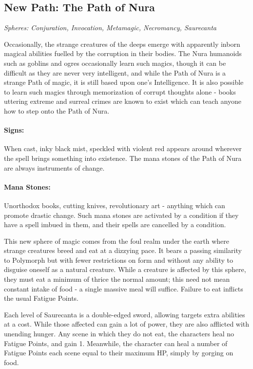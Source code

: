 \subsection{New Path: The Path of Nura}

\textit{Spheres: Conjuration, Invocation, Metamagic, Necromancy, Saurecanta}

\noindent Occasionally, the strange creatures of the deeps emerge with apparently inborn magical abilities fuelled by the corruption in their bodies.  The Nura humanoids such as goblins and ogres occasionally learn such magics, though it can be difficult as they are never very intelligent, and while the Path of Nura is a strange Path of magic, it is still based upon one's Intelligence.  It is also possible to learn such magics through memorization of corrupt thoughts alone - books uttering extreme and surreal crimes are known to exist which can teach anyone how to step onto the Path of Nura.

\paragraph{Signs:} When cast, inky black mist, speckled with violent red appears around wherever the spell brings something into existence.  The mana stones of the Path of Nura are always instruments of change.

\paragraph{Mana Stones:} Unorthodox books, cutting knives, revolutionary art - anything which can promote drastic change.  Such mana stones are activated by a condition if they have a spell imbued in them, and their spells are cancelled by a condition.


This new sphere of magic comes from the foul realm under the earth where strange creatures breed and eat at a dizzying pace.  It bears a passing similarity to Polymorph but with fewer restrictions on form and without any ability to disguise oneself as a natural creature.  While a creature is affected by this sphere, they must eat a minimum of thrice the normal amount; this need not mean constant intake of food - a single massive meal will suffice.  Failure to eat inflicts the usual Fatigue Points.

	Each level of Saurecanta is a double-edged sword, allowing targets extra abilities at a cost.  While those affected can gain a lot of power, they are also afflicted with unending hunger.  Any scene in which they do not eat, the characters heal no Fatigue Points, and gain 1.  Meanwhile, the character can heal a number of Fatigue Points each scene equal to their maximum HP, simply by gorging on food.

